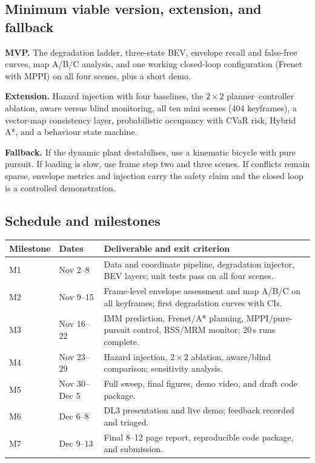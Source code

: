 \documentclass[10pt,a4paper]{article}
\renewcommand{\arraystretch}{1.0}
\begin{document}
\subsection{Minimum viable version, extension, and fallback}

\textbf{MVP.} The degradation ladder, three-state BEV, envelope recall and false-free curves, map A/B/C analysis, and one working closed-loop configuration (Frenet with MPPI) on all four scenes, plus a short demo.

\textbf{Extension.} Hazard injection with four baselines, the $2\times2$ planner--controller ablation, aware versus blind monitoring, all ten mini scenes (404 keyframes), a vector-map consistency layer, probabilistic occupancy with CVaR risk, Hybrid A*, and a behaviour state machine.

\textbf{Fallback.} If the dynamic plant destabilises, use a kinematic bicycle with pure pursuit. If loading is slow, use frame step two and three scenes. If conflicts remain sparse, envelope metrics and injection carry the safety claim and the closed loop is a controlled demonstration.

\subsection{Schedule and milestones}

\begin{center}
\footnotesize
\renewcommand{\arraystretch}{1.05}
\label{tab:schedule}\par\vspace{2pt}
\begin{tabularx}{\linewidth}{@{}l l X@{}}
\toprule
\textbf{Milestone} & \textbf{Dates} & \textbf{Deliverable and exit criterion}\\
\midrule
M1 & Nov 2--8 & Data and coordinate pipeline, degradation injector, BEV layers; unit tests pass on all four scenes.\\
M2 & Nov 9--15 & Frame-level envelope assessment and map A/B/C on all keyframes; first degradation curves with CIs.\\
M3 & Nov 16--22 & IMM prediction, Frenet/A* planning, MPPI/pure-pursuit control, RSS/MRM monitor; 20\,s runs complete.\\
M4 & Nov 23--29 & Hazard injection, $2\times2$ ablation, aware/blind comparison; sensitivity analysis.\\
M5 & Nov 30--Dec 5 & Full sweep, final figures, demo video, and draft code package.\\
M6 & Dec 6--8 & DL3 presentation and live demo; feedback recorded and triaged.\\
M7 & Dec 9--13 & Final 8--12 page report, reproducible code package, and submission.\\
\bottomrule
\end{tabularx}
\end{center}
\end{document}
